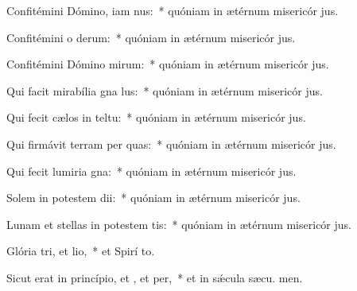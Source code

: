 \item Confitémini Dómino, iam nus:~* quóniam in ætérnum misericór jus.
\item Confitémini o derum:~* quóniam in ætérnum misericór jus.
\item Confitémini Dómino mirum:~* quóniam in ætérnum misericór jus.
\item Qui facit mirabília gna lus:~* quóniam in ætérnum misericór jus.
\item Qui fecit cælos in teltu:~* quóniam in ætérnum misericór jus.
\item Qui firmávit terram per quas:~* quóniam in ætérnum misericór jus.
\item Qui fecit lumiria gna:~* quóniam in ætérnum misericór jus.
\item Solem in potestem dii:~* quóniam in ætérnum misericór jus.
\item Lunam et stellas in potestem tis:~* quóniam in ætérnum misericór jus.
\item Glória tri, et lio,~* et Spirí to.
\item Sicut erat in princípio, et , et per,~* et in sǽcula sæcu. men.
